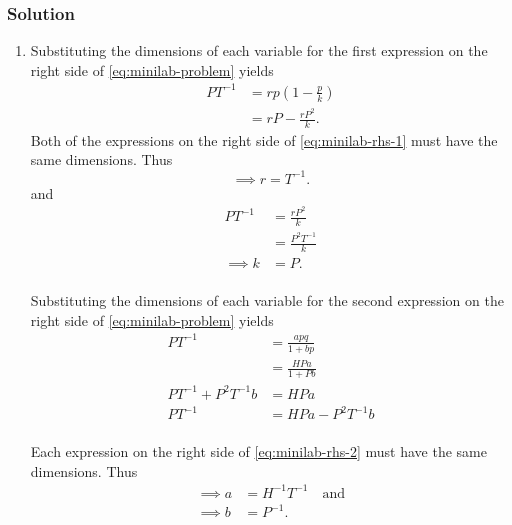 \documentclass[12pt]{article}
\begin{document}
\subsubsection*{Solution}
\begin{enumerate}
\item Substituting the dimensions of each variable for the first expression on
  the right side of \cref{eq:minilab-problem} yields
  \begin{equation}
    \label{eq:minilab-rhs-1}
    \begin{aligned}
      PT^{-1} &= rp(1-\frac{p}{k}) \\
      &= rP - \frac{rP^2}{k}.
    \end{aligned}
  \end{equation}
  Both of the expressions on the right side of \cref{eq:minilab-rhs-1} must have
  the same dimensions. Thus
  $$\implies r=T^{-1}.$$ and
  \begin{equation*}
    \begin{aligned}
      PT^{-1} &= \frac{rP^2}{k} \\
      &= \frac{P^2T^{-1}}{k} \\
      \implies k&= P. \\
    \end{aligned}
  \end{equation*}

  Substituting the dimensions of each variable for the second expression on the
  right side of \cref{eq:minilab-problem} yields
  \begin{equation}
    \label{eq:minilab-rhs-2}
    \begin{aligned}
      PT^{-1} &= \frac{apq}{1+bp} \\
      &= \frac{HPa}{1+Pb} \\
      PT^{-1}+P^2T^{-1}b &= HPa \\
      PT^{-1} &= HPa - P^2T^{-1}b \\
    \end{aligned}
  \end{equation}

  Each expression on the right side of \cref{eq:minilab-rhs-2} must have the
  same dimensions. Thus
  \begin{equation*}
    \begin{aligned}
      \implies a&=H^{-1}T^{-1} \quad\text{and} \\
      \implies b&=P^{-1}. \\
    \end{aligned}
  \end{equation*}


\end{enumerate}
\end{document}

